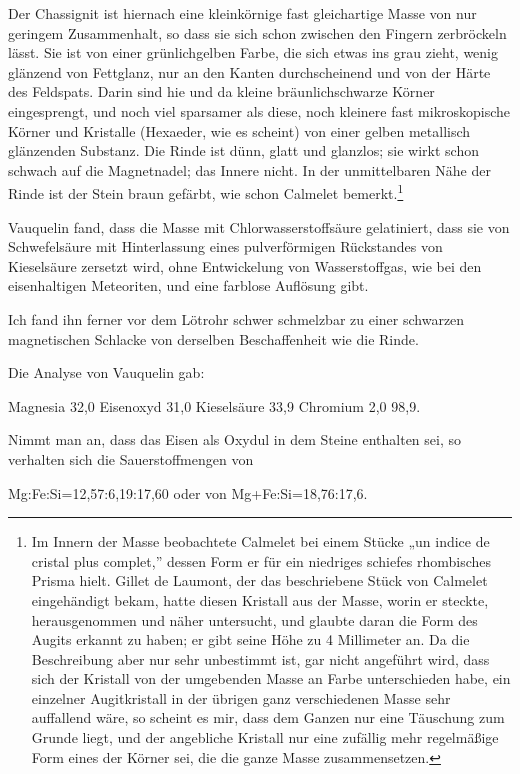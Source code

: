 \documentclass[a4paper, 11pt, oneside]{article}
\begin{document}
Der Chassignit ist hiernach eine kleinkörnige fast gleichartige Masse von nur geringem Zusammenhalt, so dass sie sich schon zwischen den Fingern zerbröckeln lässt. Sie ist von einer grünlichgelben Farbe, die sich etwas ins grau zieht, wenig glänzend von Fettglanz, nur an den Kanten durchscheinend und von der Härte des Feldspats. Darin sind hie und da kleine bräunlichschwarze Körner eingesprengt, und noch viel sparsamer als diese, noch kleinere fast mikroskopische Körner und Kristalle (Hexaeder, wie es scheint) von einer gelben metallisch glänzenden Substanz. Die Rinde ist dünn, glatt und glanzlos; sie wirkt schon schwach auf die Magnetnadel; das Innere nicht. In der unmittelbaren Nähe der Rinde ist der Stein braun gefärbt, wie schon Calmelet bemerkt.\footnote{Im Innern der Masse beobachtete Calmelet bei einem Stücke „un indice de cristal plus complet,” dessen Form er für ein niedriges schiefes rhombisches Prisma hielt. Gillet de Laumont, der das beschriebene Stück von Calmelet eingehändigt bekam, hatte diesen Kristall aus der Masse, worin er steckte, herausgenommen und näher untersucht, und glaubte daran die Form des Augits erkannt zu haben; er gibt seine Höhe zu 4 Millimeter an. Da die Beschreibung aber nur sehr unbestimmt ist, gar nicht angeführt wird, dass sich der Kristall von der umgebenden Masse an Farbe unterschieden habe, ein einzelner Augitkristall in der übrigen ganz verschiedenen Masse sehr auffallend wäre, so scheint es mir, dass dem Ganzen nur eine Täuschung zum Grunde liegt, und der angebliche Kristall nur eine zufällig mehr regelmäßige Form eines der Körner sei, die die ganze Masse zusammensetzen.}

Vauquelin fand, dass die Masse mit Chlorwasserstoffsäure gelatiniert, dass sie von Schwefelsäure mit Hinterlassung eines pulverförmigen Rückstandes von Kieselsäure zersetzt wird, ohne Entwickelung von Wasserstoffgas, wie bei den eisenhaltigen Meteoriten, und eine farblose Auflösung gibt.

Ich fand ihn ferner vor dem Lötrohr schwer schmelzbar zu einer schwarzen magnetischen Schlacke von derselben Beschaffenheit wie die Rinde.

Die Analyse von Vauquelin gab:  

Magnesia 32,0  
Eisenoxyd 31,0  
Kieselsäure 33,9  
Chromium 2,0  
98,9.  

Nimmt man an, dass das Eisen als Oxydul in dem Steine enthalten sei, so verhalten sich die Sauerstoffmengen von

Mg:Fe:Si=12,57:6,19:17,60  
oder von Mg+Fe:Si=18,76:17,6.
\end{document}
